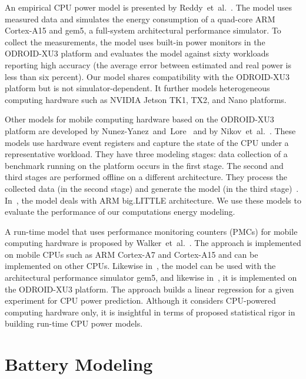 An empirical CPU power model is presented by Reddy~et~al.~\citep{reddy2017empirical}. The model uses measured data and simulates the energy consumption of a quad-core ARM Cortex-A15 and gem5, a full-system architectural performance simulator. To collect the measurements, the model uses built-in power monitors in the ODROID-XU3 platform and evaluates the model against sixty workloads reporting high accuracy (the average error between estimated and real power is less than six percent). Our model shares compatibility with the ODROID-XU3 platform but is not simulator-dependent. It further models heterogeneous computing hardware such as NVIDIA Jetson TK1, TX2, and Nano platforms. 
 
Other models for mobile computing hardware based on the ODROID-XU3 platform are developed by Nunez-Yanez~and~Lore~\citep{nunez2013enabling} and by Nikov~et~al.~\citep{nikov2015evaluation}. These models use hardware event registers and capture the state of the CPU under a representative workload. They have three modeling stages: data collection of a benchmark running on the platform occurs in the first stage. The second and third stages are performed offline on a different architecture. They process the collected data (in the second stage) and generate the model (in the third stage)~\citep{seewald2019coarse}. In~\citep{nikov2015evaluation}, the model deals with ARM big.LITTLE architecture. We use these models to evaluate the performance of our computations energy modeling.

A run-time model that uses performance monitoring counters (PMCs) for mobile computing hardware is proposed by Walker~et~al.~\citep{walker2017accurate}. The approach is implemented on mobile CPUs such as ARM Cortex-A7 and Cortex-A15 and can be implemented on other CPUs. Likewise in~\citep{reddy2017empirical}, the model can be used with the architectural performance simulator gem5, and likewise in~\citep{nunez2013enabling,nikov2015evaluation,reddy2017empirical}, it is implemented on the ODROID-XU3 platform. The approach builds a linear regression for a given experiment for CPU power prediction. Although it considers CPU-powered computing hardware only, it is insightful in terms of proposed statistical rigor in building run-time CPU power models.

\section{Battery Modeling}
\label{sec:soa-ene-bat}


